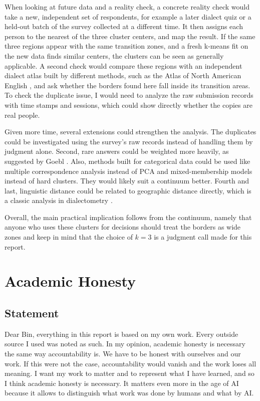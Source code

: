 \documentclass[10pt,letterpaper]{article}
\begin{document}
When looking at future data and a reality check, a concrete reality check would take a new, independent set of respondents, for example a later dialect quiz or a held-out batch of the survey collected at a different time. It then assigns each person to the nearest of the three cluster centers, and map the result. If the same three regions appear with the same transition zones, and a fresh k-means fit on the new data finds similar centers, the clusters can be seen as generally applicable. A second check would compare these regions with an independent dialect atlas built by different methods, such as the Atlas of North American English \cite{labov2006atlas}, and ask whether the borders found here fall inside its transition areas. To check the duplicate issue, I would need to analyze the raw submission records with time stamps and sessions, which could show directly whether the copies are real people.

Given more time, several extensions could strengthen the analysis. The duplicates could be investigated using the survey's raw records instead of handling them by judgment alone. Second, rare answers could be weighted more heavily, as suggested by Goebl \cite[p.~249]{nerbonne2003introducing}. Also, methods built for categorical data could be used like multiple correspondence analysis instead of PCA and mixed-membership models instead of hard clusters. They would likely suit a continuum better. Fourth and last, linguistic distance could be related to geographic distance directly, which is a classic analysis in dialectometry \cite[p.~390]{nerbonne2006progress}.

Overall, the main practical implication follows from the continuum, namely that anyone who uses these clusters for decisions should treat the borders as wide zones and keep in mind that the choice of $k=3$ is a judgment call made for this report.

\section{Academic Honesty}\label{academic-integrity-statement}
\subsection{Statement}
Dear Bin, everything in this report is based on my own work. Every outside source I used was noted as such.
In my opinion, academic honesty is necessary the same way accountability is. We have to be honest with ourselves and our work. If this were not the case, accountability would vanish and the work loses all meaning. I want my work to matter and to represent what I have learned, and so I think academic honesty is necessary. It matters even more in the age of AI because it allows to distinguish what work was done by humans and what by AI.
\end{document}
